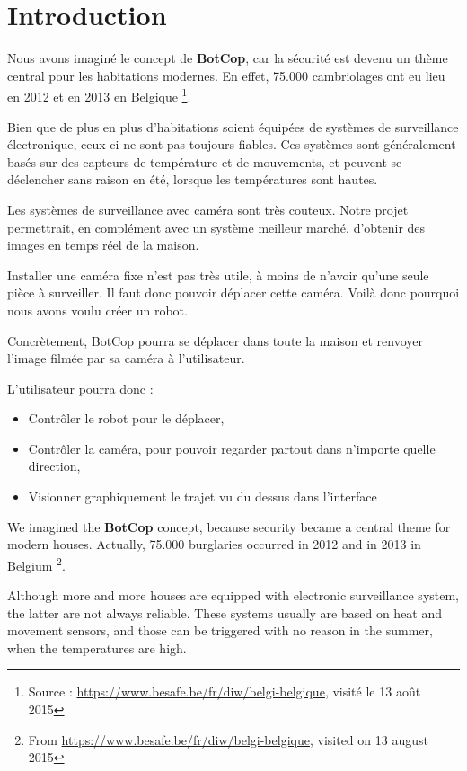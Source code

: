 \documentclass[12pt,a4paper]{report}
\begin{document}
\umonsCoverPage

\tableofcontents

\chapter{Introduction}

Nous avons imaginé le concept de \textbf{BotCop}, car la sécurité est devenu un thème central pour les habitations modernes. En effet, 75.000 cambriolages ont eu lieu en 2012 et en 2013 en Belgique \footnote{Source : \url{https://www.besafe.be/fr/diw/belgi-belgique}, visité le 13 août 2015}.

Bien que de plus en plus d'habitations soient équipées de systèmes de surveillance électronique, ceux-ci ne sont pas toujours fiables. Ces systèmes sont généralement basés sur des capteurs de température et de mouvements, et peuvent se déclencher sans raison en été, lorsque les températures sont hautes.

Les systèmes de surveillance avec caméra sont très couteux. Notre projet permettrait, en complément avec un système meilleur marché, d'obtenir des images en temps réel de la maison.

Installer une caméra fixe n'est pas très utile, à moins de n'avoir qu'une seule pièce à surveiller. Il faut donc pouvoir déplacer cette caméra. Voilà donc pourquoi nous avons voulu créer un robot.

Concrètement, BotCop pourra se déplacer dans toute la maison et renvoyer l'image filmée par sa caméra à l'utilisateur.

L'utilisateur pourra donc :

\bigbreak
\begin{itemize}
\item Contrôler le robot pour le déplacer,
\item Contrôler la caméra, pour pouvoir regarder partout dans n'importe quelle direction,
\item Visionner graphiquement le trajet vu du dessus dans l'interface
\end{itemize}

\newpage

We imagined the \textbf{BotCop} concept, because security became a central theme for modern houses. Actually, 75.000 burglaries occurred in 2012 and in 2013 in Belgium \footnote{From \url{https://www.besafe.be/fr/diw/belgi-belgique}, visited on 13 august 2015}.

Although more and more houses are equipped with electronic surveillance system, the latter are not always reliable. These systems usually are based on heat and movement sensors, and those can be triggered with no reason in the summer, when the temperatures are high.
\end{document}
